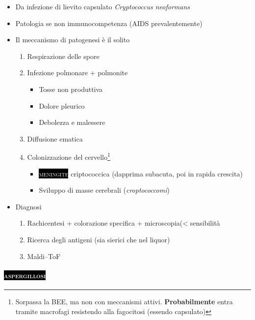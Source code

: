 \documentclass[italian,]{article}
\providecommand{\tightlist}{%
  \setlength{\itemsep}{0pt}\setlength{\parskip}{0pt}}
\newcommand{\pat}[1]{\colorbox{black}{\textcolor{white}{\textsc{#1}}}}
\begin{document}
\begin{itemize}
\tightlist
\item
  Da infezione di lievito capsulato \emph{Cryptococcus neoformans}
\item
  Patologia se non immunocompetenza (AIDS prevalentemente)
\item
  Il meccanismo di patogenesi è il solito

  \begin{enumerate}
  \def\labelenumi{\arabic{enumi}.}
  \tightlist
  \item
    Respirazione delle spore
  \item
    Infezione polmonare + polmonite

    \begin{itemize}
    \tightlist
    \item
      Tosse non produttiva
    \item
      Dolore pleurico
    \item
      Debolezza e malessere
    \end{itemize}
  \item
    Diffusione ematica
  \item
    Colonizzazione del cervello\footnote{Sorpassa la BEE, ma non con
      meccanismi attivi. \textbf{Probabilmente} entra tramite macrofagi
      resistendo alla fagocitosi (essendo capsulato)}

    \begin{itemize}
    \tightlist
    \item
      \pat{meningite} criptococcica (dapprima subacuta, poi in rapida
      crescita)
    \item
      Sviluppo di masse cerebrali (\emph{croptococcomi})
    \end{itemize}
  \end{enumerate}
\item
  Diagnosi

  \begin{enumerate}
  \def\labelenumi{\arabic{enumi}.}
  \tightlist
  \item
    Rachicentesi + colorazione specifica + microscopia(\textless{}
    sensibilità
  \item
    Ricerca degli antigeni (sia sierici che nel liquor)
  \item
    Maldi--ToF
  \end{enumerate}
\end{itemize}

\hypertarget{section-8}{%
\paragraph{\texorpdfstring{\pat{aspergillosi}}{}}\label{section-8}}
\end{document}
